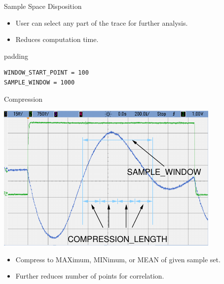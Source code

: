 \documentclass[final]{beamer}
\begin{document}
\begin{frame}[fragile]{}
\begin{columns}[t]
\begin{column}{.31\linewidth}
\begin{block}{Sample Space Disposition}
\begin{minipage}[t]{0.49\linewidth}
\begin{itemize}
            \item User can select any part of the trace for further analysis.
            \item Reduces computation time.
          \end{itemize} 
          \begin{center}
            \begin{beamercolorbox}[rounded=true]{padding}%
               \footnotesize%
              \begin{lstlisting}
WINDOW_START_POINT = 100
SAMPLE_WINDOW = 1000
              \end{lstlisting}
            \end{beamercolorbox}
          \end{center}
        \end{minipage}
       \end{block}
       \begin{block}{Compression}
        \begin{minipage}[t]{0.49\linewidth}
		\includegraphics[width=0.9\linewidth]{../figures/oscilloscope-compression-window}
        \end{minipage}%
        \begin{minipage}[t]{0.49\linewidth}%
          \vspace{-6.5cm}%
         \begin{itemize}
           \item Compress to MAXimum, MINimum, or MEAN of given sample set.
           \item Further reduces number of points for correlation.
         \end{itemize} 

\end{minipage}
\end{block}
\end{column}
\end{columns}
\end{frame}
\end{document}
